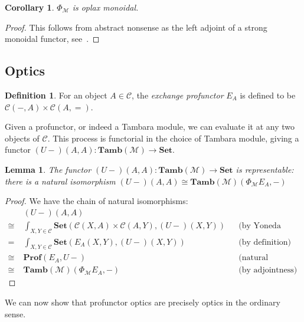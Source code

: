 \documentclass[11pt,letterpaper]{article}
\theoremstyle{plain}
\newtheorem{lemma}[theorem]{Lemma}
\newtheorem{corollary}[theorem]{Corollary}
\theoremstyle{definition}
\newtheorem{definition}[theorem]{Definition}
\newcommand{\C}{\mathscr{C}}
\newcommand{\M}{\mathscr{M}}
\newcommand{\Pastro}{\Phi}
\newcommand{\Set}{\mathbf{Set}}
\newcommand{\Prof}{\mathbf{Prof}}
\newcommand{\Tamb}{\mathbf{Tamb}}
\begin{document}
\begin{corollary}
  $\Pastro_\M$ is oplax monoidal.
\end{corollary}
\begin{proof}
  This follows from abstract nonsense as the left adjoint of a strong monoidal functor, see~\cite{Kelly1974}.
\end{proof}

\subsection{Optics}
\begin{definition}
  For an object $A \in \C$, the \emph{exchange profunctor} $E_A$ is defined to be $\C(-, A) \times \C(A, {=})$.
\end{definition}

Given a profunctor, or indeed a Tambara module, we can evaluate it at any two objects of $\C$. This process is functorial in the choice of Tambara module, giving a functor $(U-)(A,A) : \Tamb(\M) \to \Set$.

\begin{lemma}\label{lemma-rep}
  The functor $(U-)(A,A) : \Tamb(\M) \to \Set$ is representable: there is a natural isomorphism
  $(U-)(A,A) \cong \Tamb(\M)(\Pastro_\M E_A, -)$
\end{lemma}
\begin{proof}
  We have the chain of natural isomorphisms:
  \begin{align*}
    &(U-)(A,A) \\
    \cong \;&\int_{X,Y \in \C} \Set(\C(X,A) \times \C(A,Y), (U-)(X,Y)) && \text{(by Yoneda reduction twice)} \\
    =\;&\int_{X,Y \in \C} \Set(E_A(X,Y), (U-)(X,Y)) && \text{(by definition)}\\
    \cong \;&\Prof(E_A, U-) && \text{(natural transformations as ends)} \\
    \cong \;&\Tamb(\M)(\Pastro_\M E_A, -) && \text{(by adjointness)}
  \end{align*}
\end{proof}

We can now show that profunctor optics are precisely optics in the ordinary sense.
\end{document}
